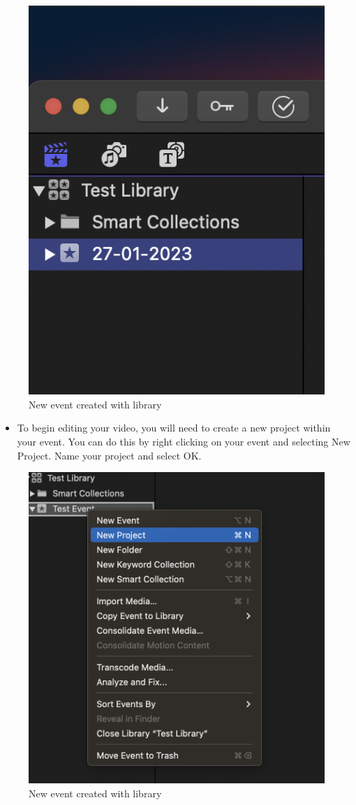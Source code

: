 \documentclass[
]{book}
\providecommand{\tightlist}{%
  \setlength{\itemsep}{0pt}\setlength{\parskip}{0pt}}
\begin{document}
\begin{figure}

{\centering \includegraphics[width=0.5\linewidth]{Event} 

}

\caption{New event created with library}\label{fig:event}
\end{figure}

\begin{itemize}
\tightlist
\item
  To begin editing your video, you will need to create a new project within your event. You can do this by right clicking on your event and selecting New Project. Name your project and select OK.
\end{itemize}

\begin{figure}

{\centering \includegraphics[width=0.5\linewidth]{Project} 

}

\caption{New event created with library}\label{fig:project}
\end{figure}
\end{document}
